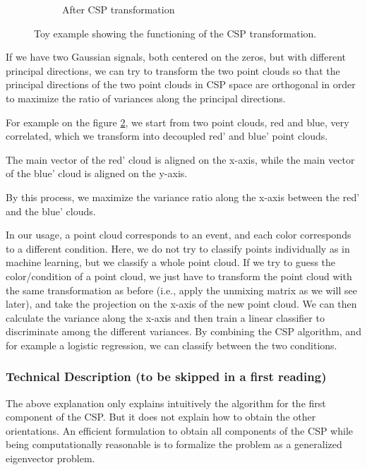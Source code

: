 \begin{figure}
\begin{subfigure}{.5\textwidth}
        \caption{After CSP transformation}
        \label{fig:after_csp}
    \end{subfigure}
    \caption{Toy example showing the functioning of the CSP transformation.}
    \label{fig:csp_intuitive}
\end{figure}

If we have two Gaussian signals, both centered on the zeros, but with different principal directions, we can try to transform the two point clouds so that the principal directions of the two point clouds in CSP space are orthogonal in order to maximize the ratio of variances along the principal directions.

For example on the figure \ref{fig:csp_intuitive}, we start from two point clouds, red and blue, very correlated, which we transform into decoupled red' and blue' point clouds.

The main vector of the red' cloud is aligned on the x-axis, while the main vector of the blue' cloud is aligned on the y-axis.

By this process, we maximize the variance ratio along the x-axis between the red' and the blue' clouds.

In our usage, a point cloud corresponds to an event, and each color corresponds to a different condition. Here, we do not try to classify points individually as in machine learning, but we classify a whole point cloud. If we try to guess the color/condition of a point cloud, we just have to transform the point cloud with the same transformation as before (i.e., apply the unmixing matrix as we will see later), and take the projection on the x-axis of the new point cloud. We can then calculate the variance along the x-axis and then train a linear classifier to discriminate among the different variances. By combining the CSP algorithm, and for example a logistic regression, we can classify between the two conditions.

\subsubsection{Technical Description (to be skipped in a first reading)}

The above explanation only explains intuitively the algorithm for the first component of the CSP. But it does not explain how to obtain the other orientations. An efficient formulation to obtain all components of the CSP while being computationally reasonable is to formalize the problem as a generalized eigenvector problem.

